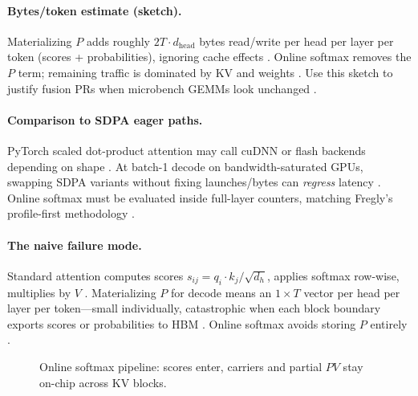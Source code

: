 \paragraph{Bytes/token estimate (sketch).} Materializing $P$ adds roughly $2T\cdot d_{\mathrm{head}}$ bytes read/write per head per layer per token (scores + probabilities), ignoring cache effects \citep{memoryfloor2026,patel2025llminference}. Online softmax removes the $P$ term; remaining traffic is dominated by KV and weights \citep{kwon2023vllm,dao2022flashattention}. Use this sketch to justify fusion PRs when microbench GEMMs look unchanged \citep{taxbreak2026}.

\paragraph{Comparison to SDPA eager paths.} PyTorch scaled dot-product attention may call cuDNN or flash backends depending on shape \citep{patel2025llminference,dlbook}. At batch-1 decode on bandwidth-saturated GPUs, swapping SDPA variants without fixing launches/bytes can \emph{regress} latency \citep{memoryfloor2026,taxbreak2026}. Online softmax must be evaluated inside full-layer counters, matching Fregly's profile-first methodology \citep{patel2025llminference}.


\paragraph{The naive failure mode.} Standard attention computes scores $s_{ij}= q_i \cdot k_j / \sqrt{d_h}$, applies softmax row-wise, multiplies by $V$ \citep{dlbook,dao2022flashattention}. Materializing $P$ for decode means an $1\times T$ vector per head per layer per token---small individually, catastrophic when each block boundary exports scores or probabilities to HBM \citep{taxbreak2026,memoryfloor2026}. Online softmax avoids storing $P$ entirely \citep{dao2022flashattention}.


\begin{figure}[t]
\centering
{}
\caption{Online softmax pipeline: scores enter, carriers and partial $PV$ stay on-chip across KV blocks.}
\label{fig:online_softmax_pipeline}
\end{figure}

